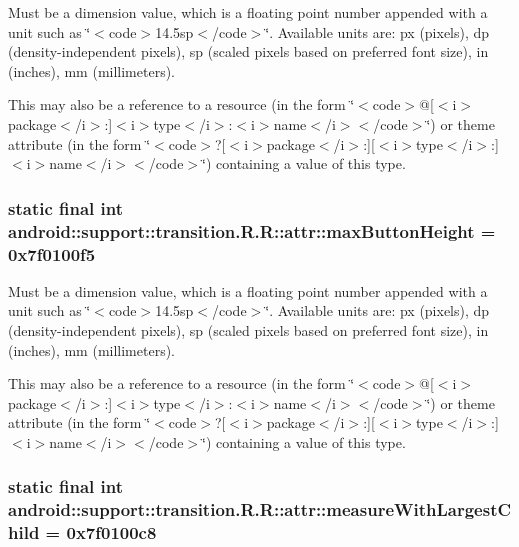 Must be a dimension value, which is a floating point number appended with a unit such as \char`\"{}$<$code$>$14.5sp$<$/code$>$\char`\"{}. Available units are: px (pixels), dp (density-independent pixels), sp (scaled pixels based on preferred font size), in (inches), mm (millimeters). 

This may also be a reference to a resource (in the form \char`\"{}$<$code$>$@\mbox{[}$<$i$>$package$<$/i$>$:\mbox{]}$<$i$>$type$<$/i$>$:$<$i$>$name$<$/i$>$$<$/code$>$\char`\"{}) or theme attribute (in the form \char`\"{}$<$code$>$?\mbox{[}$<$i$>$package$<$/i$>$:\mbox{]}\mbox{[}$<$i$>$type$<$/i$>$:\mbox{]}$<$i$>$name$<$/i$>$$<$/code$>$\char`\"{}) containing a value of this type. \hypertarget{classandroid_1_1support_1_1transition_1_1_r_1_1attr_327bf8f12b9bf74d7e5f1be34cfb9e74}{
\subsubsection[{maxButtonHeight}]{\setlength{\rightskip}{0pt plus 5cm}static final int android::support::transition.R.R::attr::maxButtonHeight = 0x7f0100f5}}
\label{classandroid_1_1support_1_1transition_1_1_r_1_1attr_327bf8f12b9bf74d7e5f1be34cfb9e74}


Must be a dimension value, which is a floating point number appended with a unit such as \char`\"{}$<$code$>$14.5sp$<$/code$>$\char`\"{}. Available units are: px (pixels), dp (density-independent pixels), sp (scaled pixels based on preferred font size), in (inches), mm (millimeters). 

This may also be a reference to a resource (in the form \char`\"{}$<$code$>$@\mbox{[}$<$i$>$package$<$/i$>$:\mbox{]}$<$i$>$type$<$/i$>$:$<$i$>$name$<$/i$>$$<$/code$>$\char`\"{}) or theme attribute (in the form \char`\"{}$<$code$>$?\mbox{[}$<$i$>$package$<$/i$>$:\mbox{]}\mbox{[}$<$i$>$type$<$/i$>$:\mbox{]}$<$i$>$name$<$/i$>$$<$/code$>$\char`\"{}) containing a value of this type. \hypertarget{classandroid_1_1support_1_1transition_1_1_r_1_1attr_5dc30089edc2c14f092ed9dc3419ec30}{
\subsubsection[{measureWithLargestChild}]{\setlength{\rightskip}{0pt plus 5cm}static final int android::support::transition.R.R::attr::measureWithLargestChild = 0x7f0100c8}}
\label{classandroid_1_1support_1_1transition_1_1_r_1_1attr_5dc30089edc2c14f092ed9dc3419ec30}


